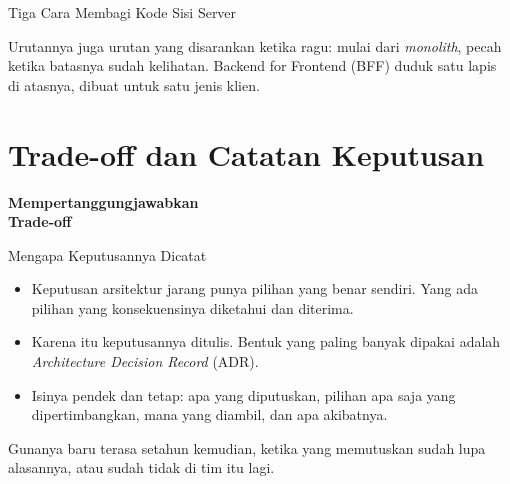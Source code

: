 \documentclass[aspectratio=169, table, 12pt]{beamer}
\begin{document}
\begin{frame}{{\Large Tiga Cara Membagi Kode Sisi Server}}
  \vspace{10pt}
  \centering

  \vspace{10pt}
  {\small Urutannya juga urutan yang disarankan ketika ragu: mulai dari
  \textit{monolith}, pecah ketika batasnya sudah kelihatan. Backend for
  Frontend (BFF) duduk satu lapis di atasnya, dibuat untuk satu jenis klien.}
\end{frame}

\section{Trade-off dan Catatan Keputusan}

\begin{frame}{\hfill}
  \centering
  \Huge{\textbf{Mempertanggungjawabkan\\Trade-off}}
\end{frame}

\begin{frame}{{\Large Mengapa Keputusannya Dicatat}}
  \vspace{10pt}
  \begin{itemize}
    \item Keputusan arsitektur jarang punya pilihan yang benar sendiri. Yang
          ada pilihan yang konsekuensinya diketahui dan diterima.
    \item Karena itu keputusannya ditulis. Bentuk yang paling banyak dipakai
          adalah \textit{Architecture Decision Record} (ADR).
    \item Isinya pendek dan tetap: apa yang diputuskan, pilihan apa saja yang
          dipertimbangkan, mana yang diambil, dan apa akibatnya.
  \end{itemize}
  \vspace{8pt}
  {\small Gunanya baru terasa setahun kemudian, ketika yang memutuskan sudah
  lupa alasannya, atau sudah tidak di tim itu lagi.}
\end{frame}
\end{document}
